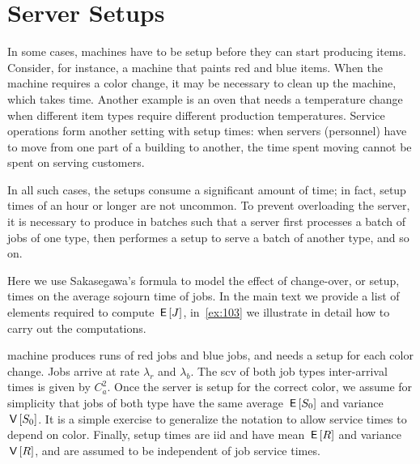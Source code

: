 \documentclass[stochastic-or.tex]{subfiles}
\begin{document}
\section{Server Setups}
\label{sec:setups-batch-proc}

In some cases, machines have to be setup before they can start producing items.
Consider, for instance, a machine that paints red and blue items.
When the machine requires a color change, it may be necessary to clean up the machine, which takes time.
Another example is an oven that needs a temperature change when different item types require different production temperatures.
Service operations form another setting with setup times: when servers (personnel) have to move from one part of a building to another, the time spent moving cannot be spent on serving customers.


In all such cases, the setups consume a significant amount of time; in fact, setup times of an hour or longer are not uncommon.
To prevent overloading the server, it is necessary to produce in batches such that a server first processes a batch of jobs of one type, then performes a setup to serve a batch of another type, and so on.

Here we use Sakasegawa's formula to model the effect of change-over, or setup, times on the average sojourn time of jobs.
In the main text we provide a list of elements required to compute $\,\mathsf{E}\left[J\right]$, in~\cref{ex:103} we illustrate in detail how to carry out the computations.

 machine produces runs of red jobs and blue jobs, and needs a setup for each color change.
Jobs arrive at rate $\lambda_r$ and $\lambda_b$.
The scv of both job types inter-arrival times is given by $C_a^2$.
Once the server is setup for the correct color, we assume for simplicity that jobs of both type have the same average  $\,\mathsf{E}\left[S_0\right]$ and variance $\,\mathsf{V}\left[S_0\right]$.
It is a simple exercise to generalize the notation to allow service times to depend on color.
Finally, setup times are iid and have mean $\,\mathsf{E}\left[R\right]$ and variance $\,\mathsf{V}\left[R\right]$, and are assumed to be independent of job service times.
\end{document}
